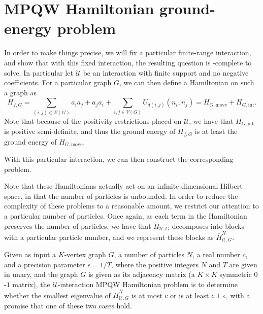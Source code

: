 \documentclass[../thesis-main/thesis-main]{subfiles}
\begin{document}
\section{MPQW Hamiltonian ground-energy problem}

In order to make things precise, we will fix a particular finite-range interaction, and show that with this fixed interaction, the resulting question is \QMA-complete to solve.  In particular let $\mathcal{U}$ be an interaction with finite support and no negative coefficients.  For a particular graph $G$, we can then define a Hamiltonian on such a graph as
\begin{equation}
H_{f,G} = \sum_{(i,j)\in E(G)} a_ia_j + a_j a_i + \sum_{i,j\in V(G)} U_{d(i,j)}(n_i,n_j) = H_{G,\text{move}} + H_{G,\text{int}}.
\end{equation}
Note that because of the positivity restrictions placed on $\mathcal{U}$, we have that $H_{G,\text{int}}$ is positive semi-definite, and thus the ground energy of $H_{f,G}$ is at least the ground energy of $H_{G,\text{move}}$.

With this particular interaction, we can then construct the corresponding problem. 

Note that these Hamiltonians actually act on an infinite dimensional Hilbert space, in that the number of particles is unbounded.  In order to reduce the complexity of these problems to a reasonable amount, we restrict our attention to a particular number of particles.  Once again, as each term in the Hamiltonian preserves the number of particles, we have that $H_{\mathcal{U},G}$ decomposes into blocks with a particular particle number, and we represent these blocks as $\overline{H}_{\mathcal{U},G}^N$.  

\begin{problem}
  Given as input a $K$-vertex graph $G$, a number of particles $N$, a real number $c$, and a precision parameter $\epsilon = 1/T$, where the positive integers $N$ and $T$ are given in unary, and the graph $G$ is given as its adjacency matrix (a $K\times K$ symmetric $0$-$1$ matrix), the $\mathcal{U}$-interaction MPQW Hamiltonian problem is to determine whether the smallest eigenvalue of $\overline{H}_{\mathcal{U},G}^N$ is at most $c$ or is at least $c+\epsilon$, with a promise that one of these two cases hold.
\end{problem}
\end{document}
